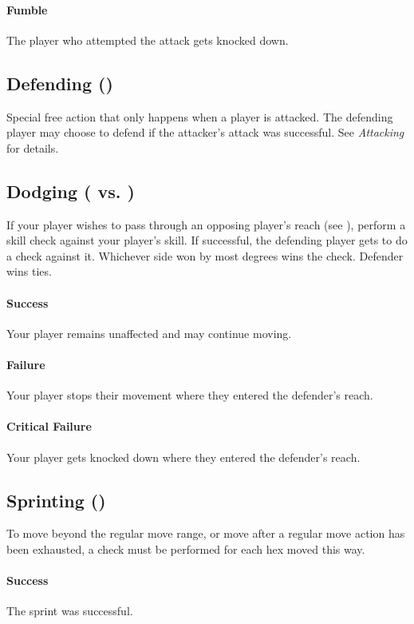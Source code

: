 \paragraph{Fumble}
The player who attempted the attack gets knocked down.

\subsection{Defending (\strength{})}
Special free action that only happens when a player is attacked.
The defending player may choose to defend if the attacker's attack was successful. See \textit{Attacking} for details.

\subsection{Dodging (\agility{} vs. \strength{})}
If your player wishes to pass through an opposing player's reach (see ), perform a skill check against your player's \agility{} skill.
If successful, the defending player gets to do a \strength{} check against it. Whichever side won by most degrees wins the check. Defender wins ties.

\paragraph{Success}
Your player remains unaffected and may continue moving.
\paragraph{Failure}
Your player stops their movement where they entered the defender's reach.
\paragraph{Critical Failure}
Your player gets knocked down where they entered the defender's reach.

\subsection{Sprinting (\agility{})}
To move beyond the regular move range, or move after a regular move action has been exhausted, a \agility{} check must be performed for each hex moved this way.
\paragraph{Success}
The sprint was successful.
